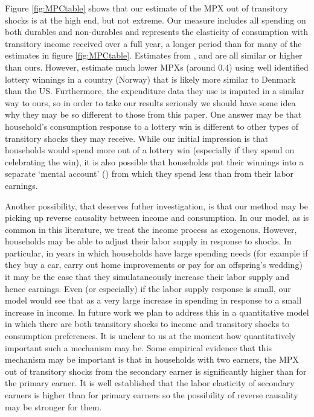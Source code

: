 \documentclass[titlepage]{\econtex}\newcommand{\texname}{IncomeUncertainty}
\begin{document}
Figure \ref{fig:MPCtable} shows that our estimate of the MPX out of transitory shocks is at the high end, but not extreme. Our measure includes all spending on both durables and non-durables and represents the elasticity of consumption with transitory income received over a full year, a longer period than for many of the estimates in figure \ref{fig:MPCtable}. Estimates from \cite{agarwal_consumption_2014}, \cite{parker_consumer_2013} and \cite{souleles_response_1999} are all similar or higher than ours. However, \cite{fagereng_mpc_2016} estimate much lower MPXs (around 0.4) using well identified lottery winnings in a country (Norway) that is likely more similar to Denmark than the US. Furthermore, the expenditure data they use is imputed in a similar way to ours, so in order to take our results seriously we should have some idea why they may be so different to those from this paper. One answer may be that household's consumption response to a lottery win is different to other types of transitory shocks they may receive. While our initial impression is that households would spend more out of a lottery win (especially if they spend on celebrating the win), it is also possible that households put their winnings into a separate `mental account' (\cite{thaler_mental_1985}) from which they spend less than from their labor earnings. 

Another possibility, that deserves futher investigation, is that our method may be picking up reverse causality between income and consumption. In our model, as is common in this literature, we treat the income process as exogenous. However, households may be able to adjust their labor supply in response to shocks. In particular, in years in which households have large spending needs (for example if they buy a car, carry out home improvements or pay for an offspring's wedding) it may be the case that they simulataneously increase their labor supply and hence earnings. Even (or especially) if the labor supply response is small, our model would see that as a very large increase in spending in response to a small increase in income. In future work we plan to address this in a quantitative model in which there are both transitory shocks to income and transitory shocks to consumption preferences. It is unclear to us at the moment how quantitatively important such a mechanism may be. Some empirical evidence that this mechanism may be important is that in households with two earners, the MPX out of transitory shocks from the secondary earner is significantly higher than for the primary earner. It is well established that the labor elasticity of secondary earners is higher than for primary earners so the possibility of reverse causality may be stronger for them.
\end{document}

